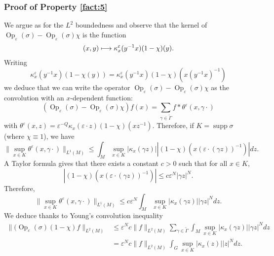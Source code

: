 \documentclass[10pt]{amsart}
\newcommand\mto{\mathchoice{\longmapsto}{\mapsto}{\mapsto}{\mapsto}}
\DeclareMathOperator{\Op}{Op}
\DeclareMathOperator{\supp}{supp}
\theoremstyle{plain}
\theoremstyle{definition}
\let\eps\varepsilon
\begin{document}
\subsubsection*{Proof of Property \eqref{fact:5}}
We argue as for the $L^2$ boundedness and observe that the kernel of $\Op_\eps(\sigma) - \Op_\eps(\sigma) \chi$
is the function
\[
(x,y)\mto \kappa^\eps_x(y^{-1} x)(1-\chi)(y).
\]
Writing
\[
\kappa^\eps_x(y^{-1} x)(1-\chi(y))= \kappa^\eps_x(y^{-1} x)(1-\chi)(x(y^{-1} x)^{-1})
\]
we deduce that we can write the operator $\Op_\eps(\sigma) - \Op_\eps(\sigma) \chi$ as the convolution with an $x$-dependent function:
\[
(\Op_\eps(\sigma) - \Op_\eps(\sigma) \chi)f(x)= \sum_{\gamma\in \widetilde{\Gamma}}f* \theta^\eps (x,\gamma \cdot)
\]
with
$\theta^\eps(x,z)= \eps^{-Q} \kappa_x (\eps\cdot z)(1- \chi)(xz^{-1}).$
Therefore, if $K=\supp \sigma$ (where $\chi\equiv 1$), we have
\[
\| \sup_{x\in K} \theta^\eps(x,\gamma \cdot) \|_{L^1(M)}\leq \int_M\sup_{x\in K} | \kappa_x(\gamma z) |
|(1-\chi)(x(\eps\cdot (\gamma z))^{-1})| dz.
\]
A Taylor formula gives that there exists a constant $c>0$ such that for all $x\in K$,
\[
|(1-\chi)(x(\eps\cdot (\gamma z))^{-1})| \leq c\eps^N |\gamma z|^N.
\]
Therefore,
\[
\| \sup_{x\in K} \theta^\eps(x,\gamma \cdot) \|_{L^1(M)}\leq c \eps^N \int_M\sup_{x\in K} | \kappa_x(\gamma z) | |\gamma z|^N dz.
\]
We deduce thanks to Young's convolution inequality
\begin{align*}
\| (\Op_\eps(\sigma)(1- \chi)f\| _{L^2(M)}
&\leq \eps^N c \| f\|_{L^2(M)} \sum_{\gamma\in \widetilde{\Gamma}} \int_M\sup_{x\in K} | \kappa_x(\gamma z) | |\gamma z|^N dz\\
&= \eps^N c \| f\|_{L^2(M)} \int_G\sup_{x\in K} | \kappa_x(z) | |z|^N dz.
\end{align*}

\end{document}
